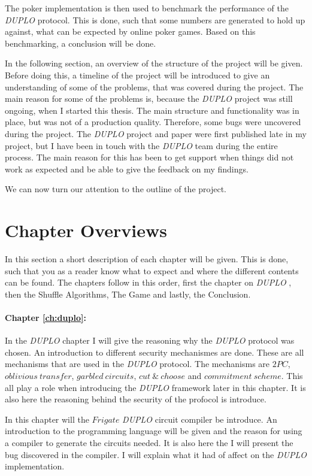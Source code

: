 \documentclass[twoside,11pt,openright]{report}
\newcommand{\DUPLO}{\textit{DUPLO} }
\begin{document}
The poker implementation is then used to benchmark the performance of the \DUPLO protocol. This is done, such that some numbers are generated to hold up against, what can be expected by online poker games. Based on this benchmarking, a conclusion will be done.

\bigskip

In the following section, an overview of the structure of the project will be given. Before doing this, a timeline of the project will be introduced to give an understanding of some of the problems, that was covered during the project. The main reason for some of the problems is, because the \DUPLO project was still ongoing, when I started this thesis. The main structure and functionality was in place, but was not of a production quality. Therefore, some bugs were uncovered during the project. The \DUPLO project and paper were first published late in my project, but I have been in touch with the \DUPLO team during the entire process. The main reason for this has been to get support when things did not work as expected and be able to give the feedback on my findings.

We can now turn our attention to the outline of the project.


\section{Chapter Overviews}
\label{ch:overview}
In this section a short description of each chapter will be given. This is done, such that you as a reader know what to expect and where the different contents can be found. The chapters follow in this order, first the chapter on \DUPLO, then the Shuffle Algorithms, The Game and lastly, the Conclusion.

\paragraph{Chapter \ref{ch:duplo}:}
In the \DUPLO chapter I will give the reasoning why the \DUPLO protocol was chosen. An introduction to different security mechanismes are done. These are all mechanisms that are used in the \DUPLO protocol. The mechanisms are $2PC$, $oblivious~transfer$, $garbled~circuits$, $cut~\&~choose$ and $commitment~scheme$. This all play a role when introducing the \DUPLO framework later in this chapter. It is also here the reasoning behind the security of the profocol is introduce.

In this chapter will the $Frigate$ \DUPLO circuit compiler be introduce. An introduction to the programming language will be given and the reason for using a compiler to generate the circuits needed. It is also here the I will present the bug discovered in the compiler. I will explain what it had of affect on the \DUPLO implementation.
\end{document}
